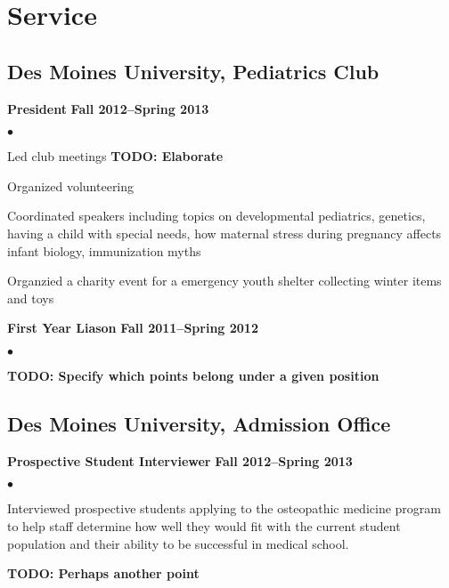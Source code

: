 \documentclass[10pt,letterpaper]{article}
\renewenvironment{itemize}{
  \begin{list}{}{
      \setlength{\leftmargin}{1.5em}
      \setlength{\itemsep}{0.25em}
      \setlength{\parskip}{0pt}
      \setlength{\parsep}{0.25em}
    }
  }{
  \end{list}
}
\newenvironment{bitemize}{
  \begin{list}{$\bullet$}{
      \setlength{\leftmargin}{1.5em}
      \setlength{\itemsep}{0.25em}
      \setlength{\parskip}{0pt}
      \setlength{\parsep}{0.25em}
    }
  }{
  \end{list}
}
\begin{document}
\section*{Service}
\subsection*{Des Moines University, Pediatrics Club}
\begin{itemize}
\item \textbf{President} \hfill \textbf{Fall 2012--Spring 2013}
  \begin{bitemize}
  \item Led club meetings \textbf{TODO: Elaborate}
  \item Organized volunteering 
  \item Coordinated speakers including topics on developmental
    pediatrics, genetics, having a child with special needs, how
    maternal stress during pregnancy affects infant biology,
    immunization myths
  \item Organzied a charity event for a emergency youth shelter
    collecting winter items and toys
  \end{bitemize}
\item \textbf{First Year Liason} \hfill \textbf{Fall 2011--Spring 2012}
  \begin{bitemize}
  \item \textbf{TODO: Specify which points belong under a given position}
  \end{bitemize}
\end{itemize}

\subsection*{Des Moines University, Admission Office}
\begin{itemize}
\item \textbf{Prospective Student Interviewer} \hfill \textbf{Fall 2012--Spring 2013}
  \begin{bitemize}
  \item Interviewed prospective students applying to the osteopathic
    medicine program to help staff determine how well they would fit
    with the current student population and their ability to be
    successful in medical school.
  \item \textbf{TODO: Perhaps another point}
  \end{bitemize}
\end{itemize}
\end{document}
